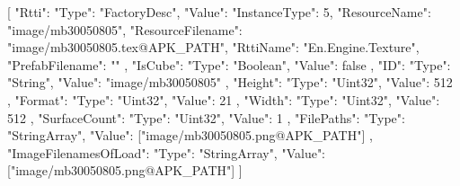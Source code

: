 [{
        "Rtti": {
            "Type": "FactoryDesc",
            "Value": {
                "InstanceType": 5,
                "ResourceName": "image/mb30050805",
                "ResourceFilename": "image/mb30050805.tex@APK_PATH",
                "RttiName": "En.Engine.Texture",
                "PrefabFilename": ""
            }
        },
        "IsCube": {
            "Type": "Boolean",
            "Value": false
        },
        "ID": {
            "Type": "String",
            "Value": "image/mb30050805"
        },
        "Height": {
            "Type": "Uint32",
            "Value": 512
        },
        "Format": {
            "Type": "Uint32",
            "Value": 21
        },
        "Width": {
            "Type": "Uint32",
            "Value": 512
        },
        "SurfaceCount": {
            "Type": "Uint32",
            "Value": 1
        },
        "FilePaths": {
            "Type": "StringArray",
            "Value": ["image/mb30050805.png@APK_PATH"]
        },
        "ImageFilenamesOfLoad": {
            "Type": "StringArray",
            "Value": ["image/mb30050805.png@APK_PATH"]
        }
    }]